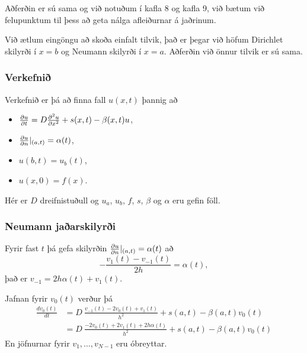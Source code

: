 \documentclass[icelandic,a4paper,12pt]{article}
\begin{document}
   Aðferðin er sú sama og við notuðum í kafla 8 og kafla 9, við bætum
   við felupunktum til þess að geta nálga afleiðurnar á jaðrinum.
   \pause
   \medskip
   
   Við ætlum eingöngu að skoða einfalt tilvik, það er þegar við höfum
   Dirichlet skilyrði í $x=b$ og Neumann skilyrði í $x=a$. 
   Aðferðin við önnur tilvik er sú sama.
  
  
  \subsubsection{Verkefnið}
   Verkefnið er þá að finna fall $u(x,t)$ þannig að 
   \begin{itemize}
 \item $\frac{{\partial} u}{{\partial} t} =  D \frac{{\partial}^2 u}{{\partial} x^2} + s(x,t) - \beta(x,t)u$,
 \item $\frac{{\partial} u}{{\partial} n}|_{(a,t)} = \alpha(t)$,
 \item $u(b,t) = u_b(t)$, 
 \item $u(x,0) = f(x)$.
\end{itemize}
Hér er $D$ dreifnistuðull og $u_a$, $u_b$, $f$, $s$, $\beta$ og
$\alpha$ eru gefin föll.
  

  
  \subsubsection{Neumann jaðarskilyrði}
  Fyrir fast $t$ þá gefa skilyrðin $\frac{{\partial} u}{{\partial} n}|_{(a,t)} = \alpha(t)$
  að
  $$
    -\frac{v_1(t) - v_{-1}(t)}{2h} = \alpha(t),
  $$ \pause
  það er $v_{-1} = 2h\alpha(t) + v_1(t)$.\pause

  Jafnan fyrir $v_0(t)$ verður þá 
 \begin{align*}
 \frac{d v_0(t)}{d t} 
 &= D\  \frac{v_{-1}(t) -2 v_0(t) + v_{1}(t)}{h^2} + s(a,t) - \beta(a,t)v_0(t) \\
 &= D\  \frac{-2 v_0(t) + 2v_{1}(t) + 2h\alpha(t) }{h^2} + s(a,t) - \beta(a,t)v_0(t) 
 \end{align*}
 \pause
 En jöfnurnar fyrir $v_1,\ldots,v_{N-1}$ eru óbreyttar.
  
\end{document}
